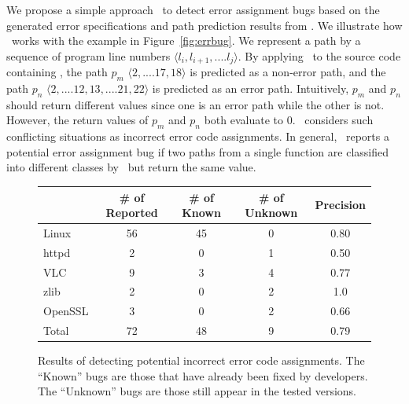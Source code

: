 \documentclass[12pt]{report}	%
\begin{document}
We propose a simple approach \bugTool\ to detect error assignment bugs based on the 
generated error specifications and path prediction results from \newTool.
%
We illustrate how \bugTool\ works with the example in Figure~\ref{fig:errbug}. 
We represent a path by a sequence of program line numbers $\langle l_i, l_{i+1}, ....l_j \rangle$.
By applying \newTool\ to the source code containing ,
the path $p_m$ $\langle 2, ....17, 18 \rangle$ is predicted as a non-error path,
and the path $p_n$ $\langle 2, ....12, 13, .... 21, 22 \rangle$ is predicted as an error path.
Intuitively, $p_m$ and $p_n$ should return different values since one is an
error path while the other is not.
However, the return values of $p_m$ and $p_n$ both evaluate to 0.
\bugTool\ considers such conflicting situations as incorrect error code assignments. 
In general, \bugTool\ reports a potential error
assignment bug if two paths from a single function are classified into
different classes  by \newTool\ but return the same value.


\begin{figure}
\centering
\begin{tabular}{l | c | c | c | c }
\toprule
& \# of Reported & \# of Known  & \# of Unknown & Precision \\
\midrule
Linux & 56 & 45 & 0 & 0.80 \\
httpd & 2 & 0 & 1 & 0.50 \\
VLC &  9 &  3 & 4 & 0.77 \\
zlib &  2 &  0 & 2 & 1.0 \\
OpenSSL & 3 & 0 & 2 & 0.66 \\
\midrule
Total & 72 &  48 & 9 & 0.79 \\
\bottomrule
\end{tabular}
\caption[Results of detecting incorrect error code assignments]{Results of detecting potential incorrect error code assignments.
The ``Known'' bugs are those that have already been fixed by developers. 
The ``Unknown'' bugs are 
those still appear in the tested versions.
}
\label{fig:bugsum}
\end{figure}
\end{document}
